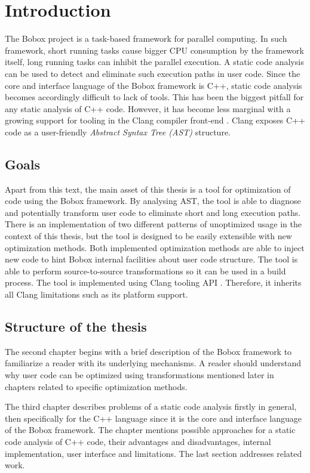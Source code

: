 \chapter{Introduction}
The Bobox project is a task-based framework for parallel computing. In such framework, short running tasks cause bigger CPU consumption by the framework itself, long running tasks can inhibit the parallel execution. A static code analysis can be used to detect and eliminate such execution paths in user code. Since the core and interface language of the Bobox framework is C++, static code analysis becomes accordingly difficult to lack of tools. This has been the biggest pitfall for any static analysis of C++ code. However, it has become less marginal with a growing support for tooling in the Clang compiler front-end \cite{clang}. Clang exposes C++ code as a user-friendly \emph{Abstract Syntax Tree (AST)} \cite{ast} structure.

\section{Goals}
Apart from this text, the main asset of this thesis is a tool for optimization of code using the Bobox framework. By analysing AST, the tool is able to diagnose and potentially transform user code to eliminate short and long execution paths. There is an implementation of two different patterns of unoptimized usage in the context of this thesis, but the tool is designed to be easily extensible with new optimization methods. Both implemented optimization methods are able to inject new code to hint Bobox internal facilities about user code structure. The tool is able to perform source-to-source transformations so it can be used in a build process. The tool is implemented using Clang tooling API \cite{clang-documentation}. Therefore, it inherits all Clang limitations such as its platform support.

\section{Structure of the thesis}
The second chapter begins with a brief description of the Bobox framework to familiarize a reader with its underlying mechanisms. A reader should understand why user code can be optimized using transformations mentioned later in chapters related to specific optimization methods.

The third chapter describes problems of a static code analysis firstly in general, then specifically for the C++ language since it is the core and interface language of the Bobox framework. The chapter mentions possible approaches for a static code analysis of C++ code, their advantages and disadvantages, internal implementation, user interface and limitations. The last section addresses related work.

